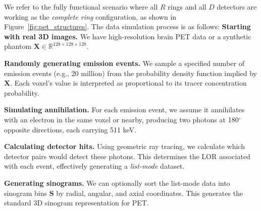 \documentclass[
reprint,
superscriptaddress,
nofootinbib,
amsmath,amssymb,
aps,
prd,
]{revtex4-2}
\begin{document}
We refer to the fully functional scenario where all \(R\) rings and all \(D\) detectors are working as the \emph{complete ring} configuration, as shown in Figure~\ref{fig:pet_structures}. The data simulation process is as follows:
\textbf{Starting with real 3D images.} We have high-resolution brain PET data or a synthetic phantom \(\mathbf{X}\in\mathbb{R}^{128\times128\times128}\).

\textbf{Randomly generating emission events.} We sample a specified number of emission events (e.g., 20 million) from the probability density function implied by \(\mathbf{X}\). Each voxel's value is interpreted as proportional to its tracer concentration probability.

\textbf{Simulating annihilation.} For each emission event, we assume it annihilates with an electron in the same voxel or nearby, producing two photons at 180\(^\circ\) opposite directions, each carrying 511 keV.

\textbf{Calculating detector hits.} Using geometric ray tracing, we calculate which detector pairs would detect these photons. This determines the LOR associated with each event, effectively generating a \emph{list-mode} dataset.

\textbf{Generating sinograms.} We can optionally sort the list-mode data into sinogram bins \(\mathbf{S}\) by radial, angular, and axial coordinates. This generates the standard 3D sinogram representation for PET.
\end{document}
